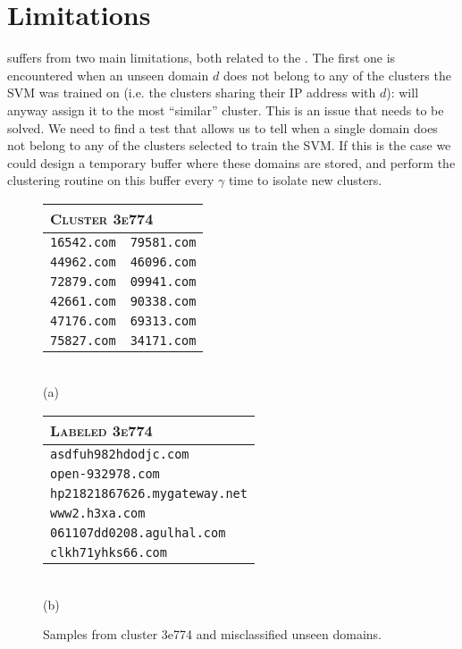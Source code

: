 \section{Limitations} %
\label{sec:limitations}
 suffers from two main limitations, both related to the
. The first one is encountered when an unseen domain $d$
does not belong to any of the clusters the SVM was trained on (i.e. the clusters sharing their IP address with $d$): \thesystem will anyway assign it to the most
``similar'' cluster. This is
an issue that needs to be solved. We need to find a test that allows us to tell
when a single domain does not belong to any of the clusters selected to train
the SVM. If this is the case we could design a temporary buffer where these
domains are stored, and perform the clustering routine on this buffer every
$\gamma$ time to isolate new clusters.
\begin{figure}[!htp]
    \begin{minipage}{.5\textwidth}
    \centering
    \begin{tabular}{ll}
        \multicolumn{2}{l}{\textsc{Cluster 3e774}} \\
        \midrule
        \texttt{16542.com} & \texttt{79581.com} \\
        \texttt{44962.com} & \texttt{46096.com} \\
        \texttt{72879.com} & \texttt{09941.com} \\
        \texttt{42661.com} & \texttt{90338.com} \\
        \texttt{47176.com} & \texttt{69313.com} \\
        \texttt{75827.com} & \texttt{34171.com} \\
    \end{tabular}\\
    \vspace{.3cm}
    {\sffamily (a)}
    \end{minipage}%
    \begin{minipage}{.5\textwidth}
        \centering
        \begin{tabular}{l}
            \textsc{Labeled 3e774} \\
            \midrule
            \texttt{asdfuh982hdodjc.com}  \\
            \texttt{open-932978.com} \\
            \texttt{hp21821867626.mygateway.net}  \\
            \texttt{www2.h3xa.com} \\
            \texttt{061107dd0208.agulhal.com} \\
             \texttt{clkh71yhks66.com} \\
        \end{tabular}\\
        \vspace{.3cm}
        {\sffamily (b)}
    \end{minipage}
    \caption{Samples from cluster 3e774 and misclassified unseen domains.}
    \label{fig:misclassified}
\end{figure}
